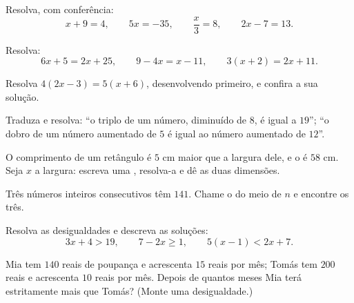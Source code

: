 \begin{exercise}[$\star$]\label{exo:g8:equations:4}
Resolva, com conferência:
\[
x + 9 = 4, \qquad
5x = -35, \qquad
\frac{x}{3} = 8, \qquad
2x - 7 = 13 .
\]
\end{exercise}

\begin{exercise}[$\star$]\label{exo:g8:equations:5}
Resolva:
\[
6x + 5 = 2x + 25, \qquad
9 - 4x = x - 11, \qquad
3(x + 2) = 2x + 11 .
\]
\end{exercise}

\begin{exercise}[$\star$]\label{exo:g8:equations:6}
Resolva $4(2x - 3) = 5(x + 6)$, desenvolvendo primeiro, e confira a sua
solução.
\end{exercise}

\begin{exercise}[$\star$]\label{exo:g8:equations:7}
Traduza e resolva: ``o triplo de um número, diminuído de $8$, é igual a
$19$''; ``o dobro de um número aumentado de $5$ é igual ao número
aumentado de $12$''.
\end{exercise}

\begin{exercise}[$\star\star$]\label{exo:g8:equations:8}
O comprimento de um retângulo é $5$ cm maior que a largura dele, e o
 é $58$ cm. Seja $x$ a largura: escreva uma ,
resolva-a e dê as duas dimensões.
\end{exercise}

\begin{exercise}[$\star\star$]\label{exo:g8:equations:9}
Três números inteiros consecutivos têm  $141$. Chame o do meio de
$n$ e encontre os três.
\end{exercise}

\begin{exercise}[$\star\star$]\label{exo:g8:equations:10}
Resolva as desigualdades e descreva as soluções:
\[
3x + 4 > 19, \qquad
7 - 2x \geq 1, \qquad
5(x - 1) < 2x + 7 .
\]
\end{exercise}

\begin{exercise}[$\star\star$]\label{exo:g8:equations:11}
Mia tem $140$ reais de poupança e acrescenta $15$ reais por mês; Tomás
tem $200$ reais e acrescenta $10$ reais por mês. Depois de quantos
meses Mia terá estritamente mais que Tomás? (Monte uma
desigualdade.)
\end{exercise}

